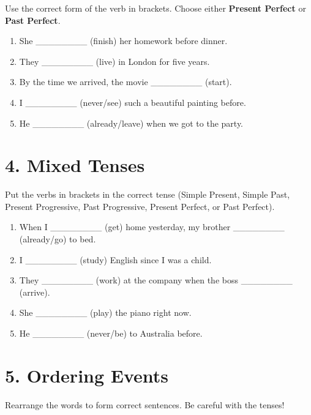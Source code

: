 Use the correct form of the verb in brackets. Choose either \textbf{Present Perfect} or \textbf{Past Perfect}.

\begin{enumerate}
    \item She \_\_\_\_\_\_\_\_ (finish) her homework before dinner.
    \item They \_\_\_\_\_\_\_\_ (live) in London for five years.
    \item By the time we arrived, the movie \_\_\_\_\_\_\_\_ (start).
    \item I \_\_\_\_\_\_\_\_ (never/see) such a beautiful painting before.
    \item He \_\_\_\_\_\_\_\_ (already/leave) when we got to the party.
\end{enumerate}

\vspace{0.5cm}

\section*{4. Mixed Tenses}

Put the verbs in brackets in the correct tense (Simple Present, Simple Past, Present Progressive, Past Progressive, Present Perfect, or Past Perfect).

\begin{enumerate}
    \item When I \_\_\_\_\_\_\_\_ (get) home yesterday, my brother \_\_\_\_\_\_\_\_ (already/go) to bed.
    \item I \_\_\_\_\_\_\_\_ (study) English since I was a child.
    \item They \_\_\_\_\_\_\_\_ (work) at the company when the boss \_\_\_\_\_\_\_\_ (arrive).
    \item She \_\_\_\_\_\_\_\_ (play) the piano right now.
    \item He \_\_\_\_\_\_\_\_ (never/be) to Australia before.
\end{enumerate}

\vspace{0.5cm}

\section*{5. Ordering Events}

Rearrange the words to form correct sentences. Be careful with the tenses!

